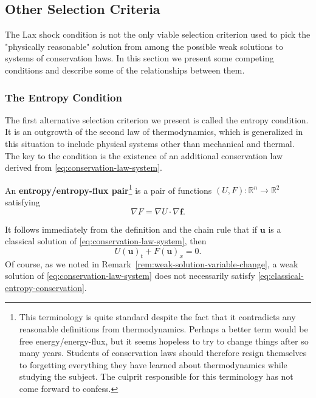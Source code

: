 \subsection{Other Selection Criteria}\label{sec:entropy-selection-criteria}

The Lax shock condition is not the only viable selection criterion used to pick the "physically reasonable" solution from among the possible weak solutions to systems of conservation laws. In this section we present some competing conditions and describe some of the relationships between them.

\subsubsection{The Entropy Condition}\label{subsec:entropy-condition}

The first alternative selection criterion we present is called the entropy condition. It is an outgrowth of the second law of thermodynamics, which is generalized in this situation to include physical systems other than mechanical and thermal. The key to the condition is the existence of an additional conservation law derived from \eqref{eq:conservation-law-system}.

\begin{Definition}
\label{def:entropy-flux-pair}
An \textbf{entropy/entropy-flux pair}\footnote{This terminology is quite standard despite the fact that it contradicts any reasonable definitions from thermodynamics. Perhaps a better term would be free energy/energy-flux, but it seems hopeless to try to change things after so many years. Students of conservation laws should therefore resign themselves to forgetting everything they have learned about thermodynamics while studying the subject. The culprit responsible for this terminology has not come forward to confess.} is a pair of functions $(U,F):\mathbb{R}^n\to\mathbb{R}^2$ satisfying
\begin{equation}\label{eq:entropy-flux-pair-definition}
\nabla F=\nabla U\cdot\nabla\bm{f}.
\end{equation}

\end{Definition}

It follows immediately from the definition and the chain rule that if $\bm{u}$ is a classical solution of \eqref{eq:conservation-law-system}, then
\begin{equation}\label{eq:classical-entropy-conservation}
U(\bm{u})_t+F(\bm{u})_x=0.
\end{equation}
Of course, as we noted in Remark~\ref{rem:weak-solution-variable-change}, a weak solution of \eqref{eq:conservation-law-system} does not necessarily satisfy \eqref{eq:classical-entropy-conservation}.

